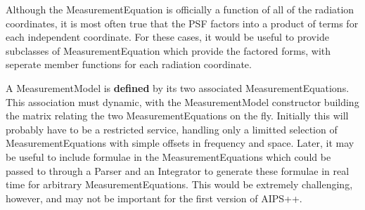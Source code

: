 Although the MeasurementEquation is officially a function of all
of the radiation coordinates, it is most often true that the PSF
factors into a product of terms for each independent coordinate.
For these cases, it would be useful to provide subclasses of 
MeasurementEquation which provide the factored forms, with seperate
member functions for each radiation coordinate.

A MeasurementModel is {\bf defined} by its two associated 
MeasurementEquations. This association must dynamic, with the 
MeasurementModel constructor building the matrix relating the two
MeasurementEquations on the fly.  Initially this will probably have
to be a restricted service, handling only a limitted selection of
MeasurementEquations with simple offsets in frequency and space. Later, it
may be useful to include formulae in the MeasurementEquations which
could be passed to through a Parser and an Integrator to generate these
formulae in real time for arbitrary MeasurementEquations. This would be
extremely challenging, however, and may not be important for the
first version of AIPS++.

\bye
